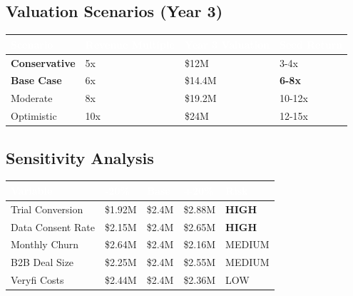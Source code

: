 \documentclass[11pt,a4paper]{article}
\begin{document}
\subsection{Valuation Scenarios (Year 3)}

\begin{center}
\begin{tabular}{L{3cm} C{3cm} C{3cm} C{2.5cm}}
    \toprule
    \textcolor{white}{\textbf{Scenario}} & \textcolor{white}{\textbf{Revenue Multiple}} & \textcolor{white}{\textbf{Year 3 Valuation}} & \textcolor{white}{\textbf{Seed Return}}\\
    \midrule
    \textbf{Conservative} & 5x & \$12M & 3-4x\\
    \textbf{Base Case} & 6x & \$14.4M & \textbf{6-8x}\\
    Moderate & 8x & \$19.2M & 10-12x\\
    Optimistic & 10x & \$24M & 12-15x\\
    \bottomrule
\end{tabular}
\end{center}

\subsection{Sensitivity Analysis}

\begin{center}
\begin{tabular}{L{4cm} R{2cm} R{2cm} R{2cm} C{2cm}}
    \toprule
    \textcolor{white}{\textbf{Variable}} & \textcolor{white}{\textbf{-20\%}} & \textcolor{white}{\textbf{Base}} & \textcolor{white}{\textbf{+20\%}} & \textcolor{white}{\textbf{Risk}}\\
    \midrule
    Trial Conversion & \$1.92M & \$2.4M & \$2.88M & \textbf{HIGH}\\
    Data Consent Rate & \$2.15M & \$2.4M & \$2.65M & \textbf{HIGH}\\
    Monthly Churn & \$2.64M & \$2.4M & \$2.16M & MEDIUM\\
    B2B Deal Size & \$2.25M & \$2.4M & \$2.55M & MEDIUM\\
    Veryfi Costs & \$2.44M & \$2.4M & \$2.36M & LOW\\
    \bottomrule
\end{tabular}
\end{center}
\end{document}
